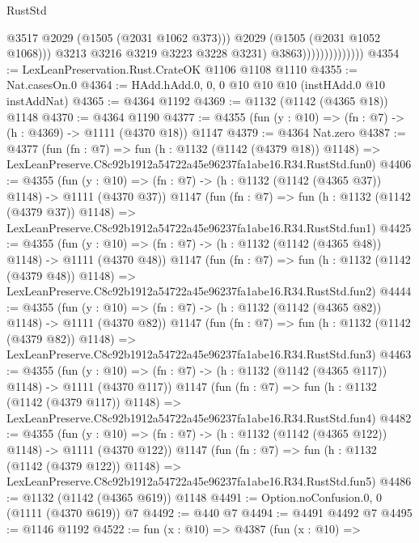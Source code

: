 \begin{lexlean}{RustStd}
\begin{coremodule}
                                      @3517
                                      @2029
                                      (@1505 (@2031 @1062 @373)))
                                    @2029
                                    (@1505 (@2031 @1052 @1068)))
                                  @3213
                                  @3216
                                  @3219
                                  @3223
                                  @3228
                                  @3231)
                                @3863))))))))))))))
@4354 := LexLeanPreservation.Rust.CrateOK @1106 @1108 @1110
@4355 := Nat.casesOn.{0}
@4364 := HAdd.hAdd.{0, 0, 0} @10 @10 @10 (instHAdd.{0} @10 instAddNat)
@4365 := @4364 @1192
@4369 := @1132 (@1142 (@4365 @18)) @1148
@4370 := @4364 @1190
@4377 := @4355 (fun (y : @10) => (fn : @7) -> (h : @4369) -> @1111 (@4370 @18)) @1147
@4379 := @4364 Nat.zero
@4387 := @4377
    (fun (fn : @7) =>
    fun (h : @1132 (@1142 (@4379 @18)) @1148) =>
    LexLeanPreserve.C8c92b1912a54722a45e96237fa1abe16.R34.RustStd.fun0)
@4406 := @4355
    (fun (y : @10) => (fn : @7) -> (h : @1132 (@1142 (@4365 @37)) @1148) -> @1111 (@4370 @37))
    @1147
    (fun (fn : @7) =>
    fun (h : @1132 (@1142 (@4379 @37)) @1148) =>
    LexLeanPreserve.C8c92b1912a54722a45e96237fa1abe16.R34.RustStd.fun1)
@4425 := @4355
    (fun (y : @10) => (fn : @7) -> (h : @1132 (@1142 (@4365 @48)) @1148) -> @1111 (@4370 @48))
    @1147
    (fun (fn : @7) =>
    fun (h : @1132 (@1142 (@4379 @48)) @1148) =>
    LexLeanPreserve.C8c92b1912a54722a45e96237fa1abe16.R34.RustStd.fun2)
@4444 := @4355
    (fun (y : @10) => (fn : @7) -> (h : @1132 (@1142 (@4365 @82)) @1148) -> @1111 (@4370 @82))
    @1147
    (fun (fn : @7) =>
    fun (h : @1132 (@1142 (@4379 @82)) @1148) =>
    LexLeanPreserve.C8c92b1912a54722a45e96237fa1abe16.R34.RustStd.fun3)
@4463 := @4355
    (fun (y : @10) => (fn : @7) -> (h : @1132 (@1142 (@4365 @117)) @1148) -> @1111 (@4370 @117))
    @1147
    (fun (fn : @7) =>
    fun (h : @1132 (@1142 (@4379 @117)) @1148) =>
    LexLeanPreserve.C8c92b1912a54722a45e96237fa1abe16.R34.RustStd.fun4)
@4482 := @4355
    (fun (y : @10) => (fn : @7) -> (h : @1132 (@1142 (@4365 @122)) @1148) -> @1111 (@4370 @122))
    @1147
    (fun (fn : @7) =>
    fun (h : @1132 (@1142 (@4379 @122)) @1148) =>
    LexLeanPreserve.C8c92b1912a54722a45e96237fa1abe16.R34.RustStd.fun5)
@4486 := @1132 (@1142 (@4365 @619)) @1148
@4491 := Option.noConfusion.{0, 0} (@1111 (@4370 @619)) @7
@4492 := @440 @7
@4494 := @4491 @4492 @7
@4495 := @1146 @1192
@4522 := fun (x : @10) =>
  @4387
    (fun (x : @10) =>

\end{coremodule}
\end{lexlean}
